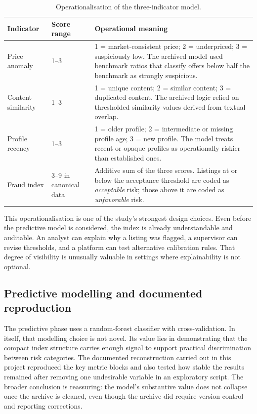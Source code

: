\documentclass[11pt,a4paper]{article}
\begin{document}
\begin{table}[H]
\centering
\caption{Operationalisation of the three-indicator model.}
\begin{tabularx}{\textwidth}{p{3.2cm} p{1.5cm} Y}
\toprule
\textbf{Indicator} & \textbf{Score range} & \textbf{Operational meaning} \\
\midrule
Price anomaly & 1--3 & 1 = market-consistent price; 2 = underpriced; 3 = suspiciously low. The archived model used benchmark ratios that classify offers below half the benchmark as strongly suspicious. \\
Content similarity & 1--3 & 1 = unique content; 2 = similar content; 3 = duplicated content. The archived logic relied on thresholded similarity values derived from textual overlap. \\
Profile recency & 1--3 & 1 = older profile; 2 = intermediate or missing profile age; 3 = new profile. The model treats recent or opaque profiles as operationally riskier than established ones. \\
Fraud index & 3--9 in canonical data & Additive sum of the three scores. Listings at or below the acceptance threshold are coded as \emph{acceptable} risk; those above it are coded as \emph{unfavorable} risk. \\
\bottomrule
\end{tabularx}
\end{table}

This operationalisation is one of the study's strongest design choices. Even before the predictive model is considered, the index is already understandable and auditable. An analyst can explain why a listing was flagged, a supervisor can revise thresholds, and a platform can test alternative calibration rules. That degree of visibility is unusually valuable in settings where explainability is not optional.

\subsection{Predictive modelling and documented reproduction}
The predictive phase uses a random-forest classifier with cross-validation. In itself, that modelling choice is not novel. Its value lies in demonstrating that the compact index structure carries enough signal to support practical discrimination between risk categories. The documented reconstruction carried out in this project reproduced the key metric blocks and also tested how stable the results remained after removing one undesirable variable in an exploratory script. The broader conclusion is reassuring: the model's substantive value does not collapse once the archive is cleaned, even though the archive did require version control and reporting corrections.
\end{document}
